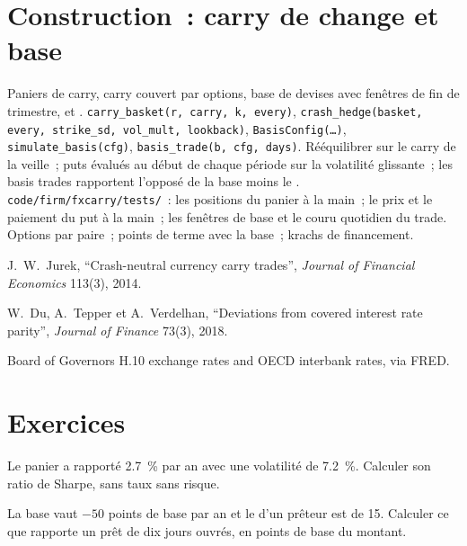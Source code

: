 \section{Construction~: carry de change et base}\label{bld:s2:cross-currency-basis-and-fx-carry:fxcarry}

\begin{build}
 Paniers de carry, carry couvert par options, base de devises avec fenêtres de fin de trimestre, et .
 \texttt{carry\_basket(r, carry, k, every)}, \texttt{crash\_hedge(basket, every, strike\_sd, vol\_mult, lookback)},
\texttt{BasisConfig(\dots)}, \texttt{simulate\_basis(cfg)}, \texttt{basis\_trade(b, cfg, days)}.
 Rééquilibrer sur le carry de la veille~; puts évalués au début de chaque période sur la volatilité glissante~; les basis trades rapportent l'opposé de la base moins le
.
 \texttt{code/firm/fxcarry/tests/}~: les positions du panier à la main~; le prix et le paiement du put à la main~; les fenêtres de base
et le couru quotidien du trade.
 Options par paire~; points de terme avec la base~; krachs de financement.
\end{build}

\begin{omsources}
\item J.~W.~Jurek, ``Crash-neutral currency carry trades'', \emph{Journal of Financial Economics} 113(3), 2014.
\item W.~Du, A.~Tepper et A.~Verdelhan, ``Deviations from covered interest rate parity'', \emph{Journal of Finance} 73(3), 2018.
\item Board of Governors H.10 exchange rates and OECD interbank rates, via FRED.
\end{omsources}

\section{Exercices}

\begin{exercise}[$\star$]\label{exo:s2:cross-currency-basis-and-fx-carry:1}
Le panier a rapporté 2.7~\% par an avec une volatilité de 7.2~\%. Calculer son ratio de Sharpe, sans taux sans risque.
\end{exercise}

\begin{exercise}[$\star$]\label{exo:s2:cross-currency-basis-and-fx-carry:2}
La base vaut $-50$ points de base par an et le  d'un prêteur est de 15. Calculer ce que rapporte un prêt de dix jours ouvrés, en points de base du
montant.
\end{exercise}

